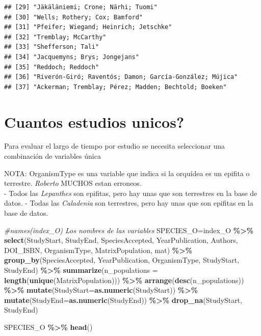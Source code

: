 \documentclass[
]{book}
\newenvironment{Shaded}{\begin{snugshade}}{\end{snugshade}}
\newcommand{\AttributeTok}[1]{\textcolor[rgb]{0.13,0.29,0.53}{#1}}
\newcommand{\CommentTok}[1]{\textcolor[rgb]{0.56,0.35,0.01}{\textit{#1}}}
\newcommand{\FunctionTok}[1]{\textcolor[rgb]{0.13,0.29,0.53}{\textbf{#1}}}
\newcommand{\NormalTok}[1]{#1}
\newcommand{\OtherTok}[1]{\textcolor[rgb]{0.56,0.35,0.01}{#1}}
\newcommand{\SpecialCharTok}[1]{\textcolor[rgb]{0.81,0.36,0.00}{\textbf{#1}}}
\theoremstyle{definition}
\theoremstyle{definition}
\theoremstyle{definition}
\theoremstyle{definition}
\theoremstyle{remark}
\begin{document}
\begin{verbatim}
## [29] "Jäkäläniemi; Crone; Närhi; Tuomi"                                     
## [30] "Wells; Rothery; Cox; Bamford"                                         
## [31] "Pfeifer; Wiegand; Heinrich; Jetschke"                                 
## [32] "Tremblay; McCarthy"                                                   
## [33] "Shefferson; Tali"                                                     
## [34] "Jacquemyns; Brys; Jongejans"                                          
## [35] "Reddoch; Reddoch"                                                     
## [36] "Riverón-Giró; Raventós; Damon; García-González; Mújica"               
## [37] "Ackerman; Tremblay; Pérez; Madden; Bechtold; Boeken"
\end{verbatim}

\section{Cuantos estudios unicos?}\label{cuantos-estudios-unicos}

Para evaluar el largo de tiempo por estudio se necesita seleccionar una combinación de variables única

NOTA: OrganismType es una variable que indica si la orquídea es un epifita o terrestre. \emph{Roberto} MUCHOS estan erroneos.\\
- Todos las \emph{Lepanthes} son epifitas, pero hay unas que son terrestres en la base de datos.
- Todas las \emph{Caladenia} son terrestres, pero hay unas que son epifitas en la base de datos.

\begin{Shaded}
\begin{Highlighting}[]
\CommentTok{\#names(index\_O) Los nombres de las variables}
\NormalTok{SPECIES\_O}\OtherTok{=}\NormalTok{index\_O }\SpecialCharTok{\%\textgreater{}\%} \FunctionTok{select}\NormalTok{(StudyStart, StudyEnd, SpeciesAccepted, YearPublication, Authors, DOI\_ISBN, OrganismType, MatrixPopulation, mat) }\SpecialCharTok{\%\textgreater{}\%} 
  \FunctionTok{group\_by}\NormalTok{(SpeciesAccepted, YearPublication, OrganismType, StudyStart, StudyEnd) }\SpecialCharTok{\%\textgreater{}\%} 
  \FunctionTok{summarize}\NormalTok{(}\AttributeTok{n\_populations =} \FunctionTok{length}\NormalTok{(}\FunctionTok{unique}\NormalTok{(MatrixPopulation))) }\SpecialCharTok{\%\textgreater{}\%} 
  \FunctionTok{arrange}\NormalTok{(}\FunctionTok{desc}\NormalTok{(n\_populations)) }\SpecialCharTok{\%\textgreater{}\%} 
  \FunctionTok{mutate}\NormalTok{(}\AttributeTok{StudyStart=}\FunctionTok{as.numeric}\NormalTok{(StudyStart)) }\SpecialCharTok{\%\textgreater{}\%} 
  \FunctionTok{mutate}\NormalTok{(}\AttributeTok{StudyEnd=}\FunctionTok{as.numeric}\NormalTok{(StudyEnd)) }\SpecialCharTok{\%\textgreater{}\%} 
  \FunctionTok{drop\_na}\NormalTok{(StudyStart, StudyEnd)}

\NormalTok{SPECIES\_O }\SpecialCharTok{\%\textgreater{}\%} \FunctionTok{head}\NormalTok{()}
\end{Highlighting}
\end{Shaded}
\end{document}
